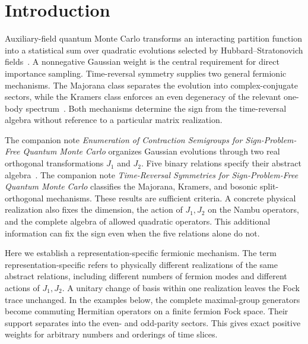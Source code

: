 \documentclass[onecolumn,aps,prb,amsmath,amssymb,superscriptaddress,longbibliography]{revtex4-2}
\begin{document}
\maketitle

\tableofcontents

\section{Introduction}

Auxiliary-field quantum Monte Carlo transforms an interacting partition
function into a statistical sum over quadratic evolutions
selected by Hubbard--Stratonovich fields~\cite{blankenbecler1981prd}.  A
nonnegative Gaussian weight is the central requirement for direct importance
sampling.  Time-reversal symmetry supplies two general fermionic mechanisms.
The Majorana class separates the evolution into complex-conjugate sectors,
while the Kramers class enforces an even degeneracy of the relevant one-body
spectrum~\cite{li2015prb,li2016prl}.  Both mechanisms determine the sign from
the time-reversal algebra without reference to a particular matrix realization.

The companion note \textit{Enumeration of Contraction Semigroups for
Sign-Problem-Free Quantum Monte Carlo} organizes Gaussian evolutions through
two real orthogonal transformations \(J_1\) and \(J_2\).  Five binary
relations specify their abstract algebra~\cite{wei2024prb}.  The companion note
\textit{Time-Reversal Symmetries for Sign-Problem-Free Quantum Monte Carlo}
classifies the Majorana, Kramers, and bosonic split-orthogonal mechanisms.
These results are sufficient criteria.  A concrete physical realization also
fixes the dimension, the action of \(J_1,J_2\) on the Nambu operators, and the
complete algebra of allowed quadratic operators.  This additional information
can fix the sign even when the five relations alone do not.

Here we establish a representation-specific fermionic mechanism.  The term
representation-specific refers to physically different realizations of the
same abstract relations, including different numbers of fermion modes and
different actions of \(J_1,J_2\).  A unitary change of basis within one
realization leaves the Fock trace unchanged.  In the examples below, the
complete maximal-group generators become commuting Hermitian operators on a
finite fermion Fock space.  Their support separates into the even- and
odd-parity sectors.  This gives exact positive weights for arbitrary numbers
and orderings of time slices.
\end{document}
